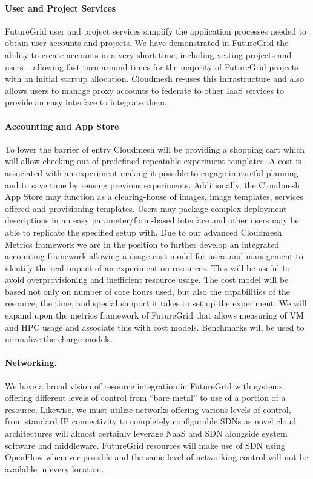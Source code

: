 \paragraph{User and Project Services}

FutureGrid user and project services simplify the application processes needed to obtain user accounts and projects. We have demonstrated in FutureGrid the ability to create accounts in a very short time, including vetting projects and users – allowing fast turn-around times for the majority of FutureGrid projects with an initial startup allocation. Cloudmesh re-uses this infrastructure and also allows users to manage proxy accounts to federate to other IaaS services to provide an easy interface to integrate them.

\paragraph{Accounting and App Store}

To lower the barrier of entry Cloudmesh will be providing a shopping cart which will allow checking out of predefined repeatable experiment templates. A cost is associated with an experiment making it possible to engage in careful planning and to save time by reusing previous experiments. Additionally, the Cloudmesh App Store may function as a clearing-house of images, image templates, services offered and provisioning templates. Users may package complex deployment descriptions in an easy parameter/form-based interface and other users may be able to replicate the specified setup with.
Due to our advanced Cloudmesh Metrics framework we are in the position to further develop an integrated accounting framework allowing a usage cost model for users and management to identify the real impact of an experiment on resources. This will be useful to avoid overprovisioning and inefficient resource usage. The cost model will be based not only on number of core hours used, but also the capabilities of the resource, the time, and special support it takes to set up the experiment. We will expand upon the metrics framework of FutureGrid that allows measuring of VM and HPC usage and associate this with cost models. Benchmarks will be used to normalize the charge models.

\paragraph{Networking.}

We have a broad vision of resource integration in FutureGrid with systems offering different levels of control from “bare metal” to use of a portion of a resource. Likewise, we must utilize networks offering various levels of control, from standard IP connectivity to completely configurable SDNs as novel cloud architectures will almost certainly leverage NaaS and SDN alongside system software and middleware. FutureGrid resources will make use of SDN using OpenFlow whenever possible and the same level of networking control will not be available in every location.

